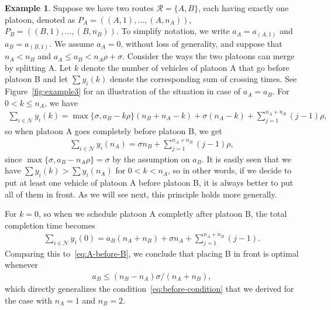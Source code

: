 \documentclass[a4paper]{report}
\theoremstyle{definition}
\newtheorem{eg}{Example}[chapter]
\theoremstyle{plain}
\begin{document}
\begin{eg}
  \label{example3}
  Suppose we have two routes $\mathcal{R} = \{ A, B \}$, each having exactly one
  platoon, denoted as $P_{A} = ((A,1), \dots, (A,n_{A}))$,
  $P_{B} = ((B,1), \dots, (B,n_{B}))$. To simplify notation, we write
  $a_{A} = a_{(A,1)}$ and $a_{B} = a_{(B,1)}$. We assume $a_{A} = 0$, without
  loss of generality, and suppose that $n_{A} < n_{B}$ and
  $a_{A} \leq a_{B} < n_{A}\rho + \sigma$. Consider the ways the two platoons
  can merge by splitting A. Let $k$ denote the number of vehicles of platoon A
  that go before platoon B and let $\sum y_{i}(k)$ denote the corresponding
  sum of crossing times. See Figure~\ref{fig:example3} for an illustration of the
  situation in case of $a_{A} = a_{B}$. For $0 < k \leq n_{A}$, we have
  \begin{align*}
    \sum_{i \in \mathcal{N}} y_{i} (k) = \max\{ \sigma, a_{B} - k\rho\} (n_{B} + n_{A} - k) + \sigma (n_{A} - k) + \sum_{j=1}^{n_{A}+n_{B}} (j-1) \rho ,
  \end{align*}
  so when platoon A goes completely before platoon B, we get
  \begin{align}
    \sum_{i \in \mathcal{N}} y_{i} (n_{A}) = \sigma n_{B} + \sum_{j=1}^{n_{A}+n_{B}} (j-1) \rho ,
    \label{eq:A-before-B}
  \end{align}
  since $\max\{ \sigma, a_{B} - n_{A} \rho \} = \sigma$ by the assumption on
  $a_{B}$. It is easily seen that we have $\sum y_{i}(k) > \sum y_{i} (n_{A})$
  for $0 < k < n_{A}$, so in other words, if we decide to put at least one
  vehicle of platoon A before platoon B, it is always better to put all of them
  in front. As we will see next, this principle holds more generally.

  For $k=0$, so when we schedule platoon A completly after platoon B, the total
  completion time becomes
  \begin{align*}
    \sum_{i \in \mathcal{N}} y_{i} (0) = a_{B} (n_{A} + n_{B}) + \sigma n_{A} + \sum_{j=1}^{n_{A}+n_{B}} (j-1) .
  \end{align*}
  Comparing this to~\eqref{eq:A-before-B}, we conclude that placing B in front
  is optimal whenever
  \begin{align*}
    a_{B} \leq (n_{B} - n_{A}) \sigma / (n_{A} + n_{B}) ,
  \end{align*}
  which directly generalizes the condition~\eqref{eq:before-condition} that we
  derived for the case with $n_{A} = 1$ and $n_{B} = 2$.
\end{eg}
\end{document}
